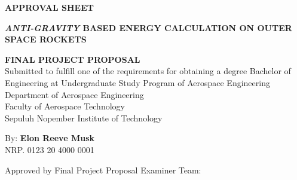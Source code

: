 \begin{center}
	\large
  \textbf{APPROVAL SHEET}
\end{center}

\thispagestyle{empty}

\begin{center}
  \textbf{\emph{ANTI-GRAVITY} BASED ENERGY CALCULATION ON OUTER SPACE ROCKETS}
\end{center}

\begingroup
  \small

  \begin{center}
    \textbf{FINAL PROJECT PROPOSAL} \\
    Submitted to fulfill one of the requirements for obtaining a degree
    Bachelor of Engineering at 
    Undergraduate Study Program of Aerospace Engineering \\
    Department of Aerospace Engineering \\
    Faculty of Aerospace Technology \\
    Sepuluh Nopember Institute of Technology
  \end{center}

  \begin{center}
    By: \textbf{Elon Reeve Musk} \\
    NRP. 0123 20 4000 0001
  \end{center}

  \begin{center}
    Approved by Final Project Proposal Examiner Team:
  \end{center}

  \begingroup
    \setlength{\tabcolsep}{0pt}

